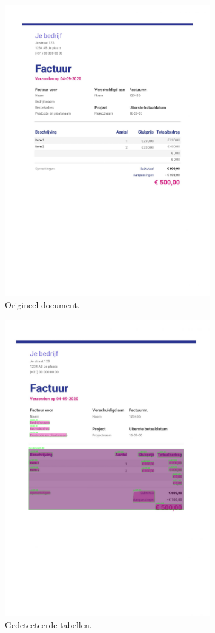 \begin{figure}[H]
    \centering
    \includegraphics[width=0.8\textwidth]{test-resultaten/25/original.jpg}
    \caption{Origineel document.}
\end{figure}

\begin{figure}[H]
    \centering
    \includegraphics[width=0.8\textwidth]{test-resultaten/25/detected_tables.png}
    \caption{Gedetecteerde tabellen.}
\end{figure}

